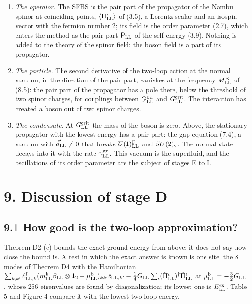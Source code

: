 \documentclass[
  10pt,
]{article}
\providecommand{\tightlist}{%
  \setlength{\itemsep}{0pt}\setlength{\parskip}{0pt}}
\begin{document}
\begin{enumerate}
\def\labelenumi{\arabic{enumi}.}
\tightlist
\item
  \emph{The operator.} The SFBS is the pair part of the propagator of
  the Nambu spinor at coinciding points,
  \(\langle\Pi^\iota_{\rm LL}\rangle\) of (3.5), a Lorentz scalar and an
  isospin vector with the fermion number 2; its field is the order
  parameter (2.7), which enters the method as the pair part
  \(\mathsf P_{\rm LL}\) of the self-energy (3.9). Nothing is added to
  the theory of the spinor field: the boson field is a part of its
  propagator.
\item
  \emph{The particle.} The second derivative of the two-loop action at
  the normal vacuum, in the direction of the pair part, vanishes at the
  frequency \(M^{\rm B}_{\rm LL}\) of (8.5): the pair part of the
  propagator has a pole there, below the threshold of two spinor
  charges, for couplings between \(G^{\rm bd}_{\rm LL}\) and
  \(G^{\rm crit}_{\rm LL}\). The interaction has created a boson out of
  two spinor charges.
\item
  \emph{The condensate.} At \(G^{\rm crit}_{\rm LL}\) the mass of the
  boson is zero. Above, the stationary propagator with the lowest energy
  has a pair part: the gap equation (7.4), a vacuum with
  \(\vec d_{\rm LL}\ne0\) that breaks \(U(1)^{\rm F}_{\rm LL}\) and
  \(SU(2)_{\rm v}\). The normal state decays into it with the rate
  \(\gamma^{\rm gr}_{\rm LL}\). This vacuum is the superfluid, and the
  oscillations of its order parameter are the subject of stages E to I.
\end{enumerate}

\hypertarget{discussion-of-stage-d}{%
\section{9. Discussion of stage D}\label{discussion-of-stage-d}}

\hypertarget{how-good-is-the-two-loop-approximation}{%
\subsection{9.1 How good is the two-loop
approximation?}\label{how-good-is-the-two-loop-approximation}}

Theorem D2 (c) bounds the exact ground energy from above; it does not
say how close the bound is. A test in which the exact answer is known is
one site: the 8 modes of Theorem D4 with the Hamiltonian
\(\sum_{k,k'}\hat c^\dagger_{{\rm LL},k}(m^{\rm b}_{\rm LL}\beta_{\rm LL}\otimes\mathsf 1_2-\mu^{\rm b}_{\rm LL})_{kk'}\hat c_{{\rm LL},k'}-\tfrac14G_{\rm LL}\sum_\iota(\hat\Pi^\iota_{\rm LL})^\dagger\hat\Pi^\iota_{\rm LL}\)
at \(\mu^{\rm b}_{\rm LL}=-\tfrac32G_{\rm LL}\), whose 256 eigenvalues
are found by diagonalization; its lowest one is \(E^{\rm ex}_{\rm LL}\).
Table 5 and Figure 4 compare it with the lowest two-loop energy.
\end{document}
